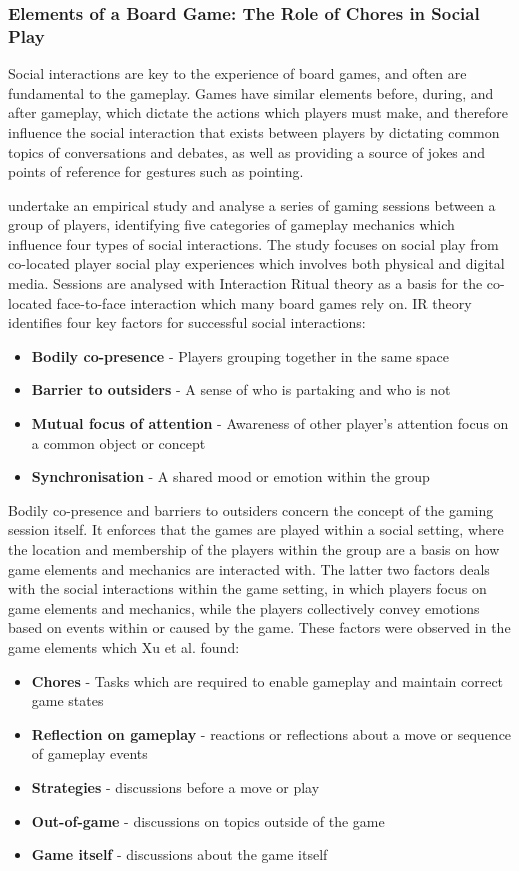 \documentclass[12pt]{article}
\begin{document}
\subsubsection{Elements of a Board Game: The Role of Chores in Social Play}
Social interactions are key to the experience of board games, and often are fundamental to the gameplay. 
Games have similar elements before, during, and after gameplay, which dictate the actions which players must make, and therefore influence the social interaction that exists between players by dictating common topics of conversations and debates, as well as providing a source of jokes and points of reference for gestures such as pointing. 

\textcite{xu2011chores} undertake an empirical study and analyse a series of gaming sessions between a group of players, identifying five categories of gameplay mechanics which influence four types of social interactions. 
The study focuses on social play from co-located player social play experiences which involves both physical and digital media. 
Sessions are analysed with Interaction Ritual theory as a basis for the co-located face-to-face interaction which many board games rely on. 
IR theory identifies four key factors for successful social interactions:
\begin{itemize}
    \item \textbf{Bodily co-presence} - Players grouping together in the same space
    \item \textbf{Barrier to outsiders} - A sense of who is partaking and who is not
    \item \textbf{Mutual focus of attention} - Awareness of other player's attention focus on a common object or concept
    \item \textbf{Synchronisation} - A shared mood or emotion within the group
\end{itemize}
Bodily co-presence and barriers to outsiders concern the concept of the gaming session itself.
It enforces that the games are played within a social setting, where the location and membership of the players within the group are a basis on how game elements and mechanics are interacted with. 
The latter two factors deals with the social interactions within the game setting, in which players focus on game elements and mechanics, while the players collectively convey emotions based on events within or caused by the game.
These factors were observed in the game elements which Xu et al. found: 
\begin{itemize}
    \item \textbf{Chores} - Tasks which are required to enable gameplay and maintain correct game states
    \item \textbf{Reflection on gameplay} - reactions or reflections about a move or sequence of gameplay events
    \item \textbf{Strategies} - discussions before a move or play 
    \item \textbf{Out-of-game} - discussions on topics outside of the game 
    \item \textbf{Game itself} - discussions about the game itself
\end{itemize}
\end{document}
